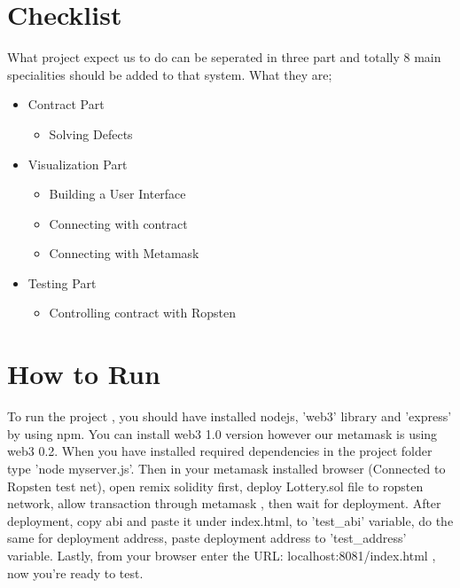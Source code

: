 \documentclass[]{scrreprt}
\begin{document}
\section{Checklist}
What project expect us to do can be seperated in three part and totally 8 main specialities should be added to that system. What they are;
\begin{itemize}
	\item 
	Contract Part
	\begin{itemize}
		\item 
		Solving Defects
	\end{itemize}
	\item 
	Visualization Part
	\begin{itemize}
		\item 
		Building a User Interface
		\item 
		Connecting with contract
		\item 
		Connecting with Metamask
	\end{itemize}
	\item 
	Testing Part
	\begin{itemize}
		\item 
		Controlling contract with Ropsten
	\end{itemize}
\end{itemize}
\section{How to Run}
To run the project , you should have installed nodejs, 'web3' library and 'express' by using npm. You can install web3 1.0 version however our metamask is using web3 0.2. When you have installed required dependencies in the project folder type 'node myserver.js'. Then in your metamask installed browser (Connected to Ropsten test net), open remix solidity first, deploy Lottery.sol file to ropsten network, allow transaction through metamask , then wait for deployment. After deployment, copy abi and paste it under index.html, to 'test\_abi' variable, do the same for deployment address, paste deployment address to 'test\_address' variable. 
Lastly, from your browser enter the URL: localhost:8081/index.html , now you're ready to test.
	
\end{document}
